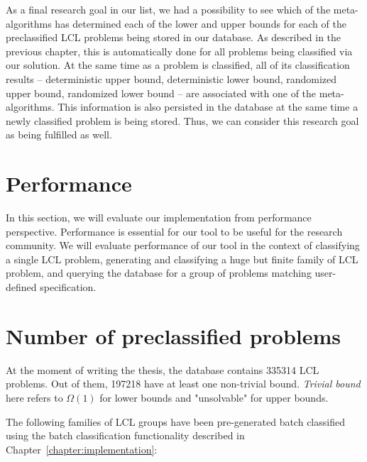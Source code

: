 As a final research goal in our list, we had a possibility
to see which of the meta-algorithms has determined each
of the lower and upper bounds for each of the preclassified
LCL problems being stored in our database. As described in the
previous chapter, this is automatically done for all problems being
classified via our solution. At the same time as a problem is classified,
all of its classification results -- deterministic upper bound,
deterministic lower bound, randomized upper bound, randomized lower bound --
are associated with one of the meta-algorithms. This information is also
persisted in the database at the same time a newly classified problem
is being stored. Thus, we can consider this research goal as being
fulfilled as well.

\section{Performance}

In this section, we will evaluate our implementation from
performance perspective. Performance is essential for
our tool to be useful for the research community.
We will evaluate performance of our tool
in the context of classifying a single LCL problem,
generating and classifying a huge but finite family of
LCL problem, and querying the database for a group
of problems matching user-defined specification.




\section{Number of preclassified problems}

At the moment of writing the thesis, the database contains 335314
LCL problems. Out of them, 197218 have at least one non-trivial bound. \emph{Trivial bound} here
refers to $\Omega(1)$ for lower bounds and "unsolvable" for upper bounds.

The following families of LCL groups have been pre-generated batch classified
using the batch classification functionality described in Chapter~\ref{chapter:implementation}:

